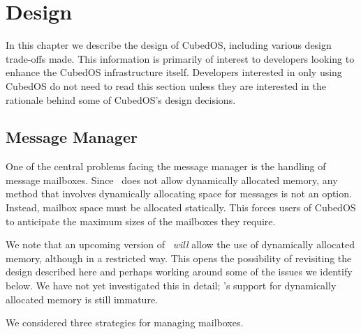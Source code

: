 
\section{Design}
\label{sec:development-design}

In this chapter we describe the design of CubedOS, including various design trade-offs made.
This information is primarily of interest to developers looking to enhance the CubedOS
infrastructure itself. Developers interested in only using CubedOS do not need to read this
section unless they are interested in the rationale behind some of CubedOS's design decisions.

\subsection{Message Manager}
\label{sec:design-message-manager}

One of the central problems facing the message manager is the handling of message mailboxes.
Since \SPARK\ does not allow dynamically allocated memory, any method that involves dynamically
allocating space for messages is not an option. Instead, mailbox space must be allocated
statically. This forces users of CubedOS to anticipate the maximum sizes of the mailboxes they
require.

We note that an upcoming version of \SPARK\ \emph{will} allow the use of dynamically allocated
memory, although in a restricted way. This opens the possibility of revisiting the design
described here and perhaps working around some of the issues we identify below. We have not yet
investigated this in detail; \SPARK's support for dynamically allocated memory is still
immature.

We considered three strategies for managing mailboxes.

